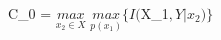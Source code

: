 \documentclass[preview]{standalone}
\begin{document}
\begin{center}
C_0 = $\underset{x_2 \in {X}}{max}$ $\underset{p(x_1)}{max} \{I($X_1$,Y|x_2)\}$
\end{center}
\end{document}
